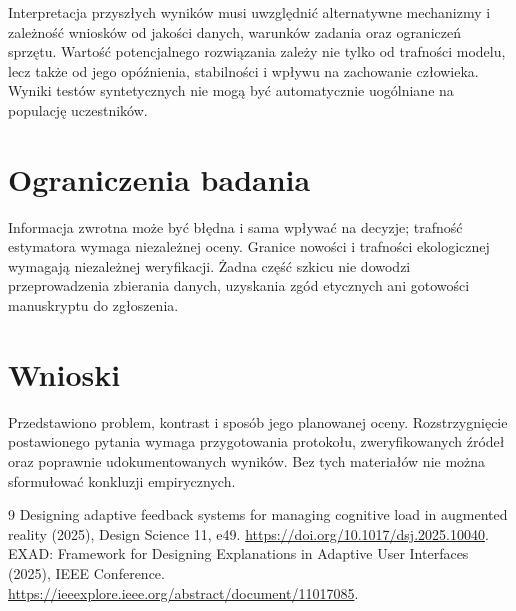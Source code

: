 \documentclass[11pt,a4paper]{article}
\begin{document}
Interpretacja przyszłych wyników musi uwzględnić alternatywne mechanizmy i zależność wniosków od jakości danych, warunków zadania oraz ograniczeń sprzętu. Wartość potencjalnego rozwiązania zależy nie tylko od trafności modelu, lecz także od jego opóźnienia, stabilności i wpływu na zachowanie człowieka. Wyniki testów syntetycznych nie mogą być automatycznie uogólniane na populację uczestników.

\section{Ograniczenia badania}

Informacja zwrotna może być błędna i sama wpływać na decyzje; trafność estymatora wymaga niezależnej oceny. Granice nowości i trafności ekologicznej wymagają niezależnej weryfikacji. Żadna część szkicu nie dowodzi przeprowadzenia zbierania danych, uzyskania zgód etycznych ani gotowości manuskryptu do zgłoszenia.

\section{Wnioski}

Przedstawiono problem, kontrast i sposób jego planowanej oceny. Rozstrzygnięcie postawionego pytania wymaga przygotowania protokołu, zweryfikowanych źródeł oraz poprawnie udokumentowanych wyników. Bez tych materiałów nie można sformułować konkluzji empirycznych.

\begin{thebibliography}{9}
 Designing adaptive feedback systems for managing cognitive load in augmented reality (2025), Design Science 11, e49. \url{https://doi.org/10.1017/dsj.2025.10040}.
 EXAD: Framework for Designing Explanations in Adaptive User Interfaces (2025), IEEE Conference. \url{https://ieeexplore.ieee.org/abstract/document/11017085}.
\end{thebibliography}
\end{document}
